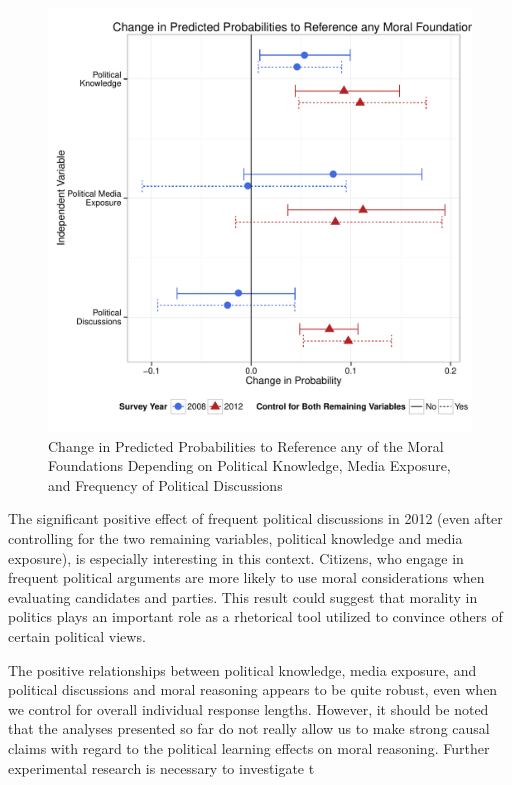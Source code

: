 \documentclass[12pt]{article}
\begin{document}
\begin{figure}\centering
\includegraphics[scale=.6]{../calc/fig/m3_learn.pdf}
\caption{Change in Predicted Probabilities to Reference any of the Moral Foundations Depending on Political Knowledge, Media Exposure, and Frequency of Political Discussions}\label{fig:m3_learn}
\end{figure}

The significant positive effect of frequent political discussions in 2012 (even after controlling for the two remaining variables, political knowledge and media exposure), is especially interesting in this context. Citizens, who engage in frequent political arguments are more likely to use moral considerations when evaluating candidates and parties. This result could suggest that morality in politics plays an important role as a rhetorical tool utilized to convince others of certain political views.

The positive relationships between political knowledge, media exposure, and political discussions and moral reasoning appears to be quite robust, even when we control for overall individual response lengths. However, it should be noted that the analyses presented so far do not really allow us to make strong causal claims with regard to the political learning effects on moral reasoning. Further experimental research is necessary to investigate t
\end{document}
